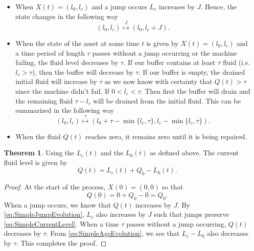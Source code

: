 \documentclass[a4paper]{thesis}
\theoremstyle{definition}
\newtheorem{theorem}{Theorem}[section]
\begin{document}
\begin{itemize}
	\item When $X(t)=(l_0,l_c)$ and a jump occurs $L_c$ increases by $J$.
	Hence, the state changes in the following way
	\begin{equation}\label{eq:SimpleJumpEvolution}
	(l_0,l_c)\stackrel{J}{\mapsto} (l_0,l_c+J).
	\end{equation}
	\item When the state of the asset at some time $t$ is given by $X(t)=(l_0,l_c)$ and a time period of length $\tau$ passes without a jump occurring or the machine failing, the fluid level decreases by $\tau$.
	If our buffer contains at least $\tau$ fluid (i.e. $l_c>\tau$), then the buffer will decrease by $\tau$.
	If our buffer is empty, the drained initial fluid will increase by $\tau$ as we now know with certainty that $Q(t)>\tau$ since the machine didn't fail.
	If $0<l_c<\tau$. Then first the buffer will drain and the remaining fluid $\tau-l_c$ will be drained from the initial fluid.
	This can be summarized in the following way
	\begin{equation}\label{eq:SimpleAgeEvolution}
	(l_0,l_c)\stackrel\tau\mapsto (l_0+\tau-\min\{l_c,\tau\},l_c-\min\{l_c,\tau\}).
	\end{equation}
	\item When the fluid $Q(t)$ reaches zero, it remains zero until it is being repaired.
\end{itemize}
\begin{theorem}\label{theorem:SimpleCurrentLevel}
	Using the $L_c(t)$ and the $L_0(t)$ as defined above.
	The current fluid level is given by
	\begin{equation}\label{eq:SimpleCurrentLevel}
	Q(t)=L_c(t)+Q_0-L_0(t).
	\end{equation}
	\begin{proof}
		At the start of the process, $X(0)=(0,0)$ so that
		\[
		Q(0)=0+Q_0-0=Q_0.
		\]
		When a jump occurs, we know that $Q(t)$ increases by $J$.
		By \eqref{eq:SimpleJumpEvolution}, $L_c$ also increases by $J$ such that jumps preserve \eqref{eq:SimpleCurrentLevel}.
		When a time $\tau$ passes without a jump occurring, $Q(t)$ decreases by $\tau$.
		From \eqref{eq:SimpleAgeEvolution}, we see that $L_c-L_0$ also decreases by $\tau$.
		This completes the proof.
	\end{proof}
\end{theorem}
\end{document}
